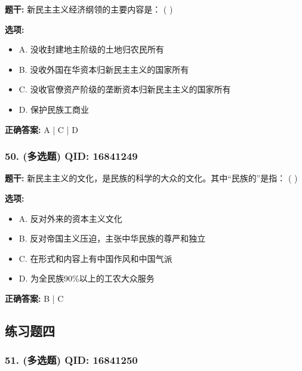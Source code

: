 \documentclass[12pt,UTF8]{ctexart}
\begin{document}
\textbf{题干:}
新民主主义经济纲领的主要内容是： ( )

\textbf{选项:}
\begin{itemize}[leftmargin=*]

  \item A. 没收封建地主阶级的土地归农民所有

  \item B. 没收外国在华资本归新民主主义的国家所有

  \item C. 没收官僚资产阶级的垄断资本归新民主主义的国家所有

  \item D. 保护民族工商业

\end{itemize}

\textbf{正确答案:}
A | C | D

\vspace{0.3em}\hrulefill\vspace{0.7em}

\subsubsection*{50. (多选题) \small QID: 16841249}

\textbf{题干:}
新民主主义的文化，是民族的科学的大众的文化。其中“民族的”是指： ( )

\textbf{选项:}
\begin{itemize}[leftmargin=*]

  \item A. 反对外来的资本主义文化

  \item B. 反对帝国主义压迫，主张中华民族的尊严和独立

  \item C. 在形式和内容上有中国作风和中国气派

  \item D. 为全民族90\%以上的工农大众服务

\end{itemize}

\textbf{正确答案:}
B | C

\vspace{0.3em}\hrulefill\vspace{0.7em}

\subsection*{练习题四}

\subsubsection*{51. (多选题) \small QID: 16841250}
\end{document}
